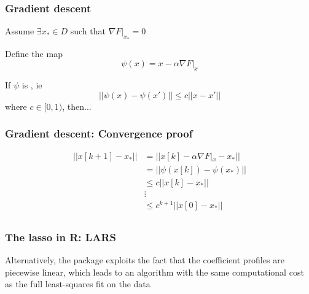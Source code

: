 \documentclass{beamer}
\begin{document}
\begin{frame}
\frametitle{Gradient descent}
Assume $\exists x_* \in D$ such that $\nabla F|_{x_*} = 0$

\vsp
Define the map
\[
\psi(x) = x - \alpha \nabla F|_{x} 
\]

\vsp

If $\psi$ is , ie
\[
||\psi(x) - \psi(x')|| \leq c ||x - x'||
\]
where $c \in [0,1)$, then...
\vsp


\end{frame}

\begin{frame}
\frametitle{Gradient descent: Convergence proof}
\begin{align}
||x[k+1] - x_*||  
& = 
||x[k] - \alpha \nabla F|_{x}   - x_*||  \\
& = || \psi(x[k]) - \psi(x_*) || \\
\label{eq:linear}
& \leq c ||x[k] - x_* || \\
& \vdots \\
& \leq c^{k+1} ||x[0] - x_* || \\
\end{align}

\vsp
{}

\end{frame}
\begin{frame}[fragile]
\frametitle{The lasso in R: LARS}

Alternatively, the  package exploits the fact that the coefficient 
profiles are piecewise linear, which leads to an algorithm with the same computational
cost as the full least-squares fit on the data 

\end{frame}
\end{document}
